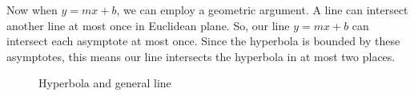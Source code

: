 \documentclass{homework}
\begin{document}
\begin{enumerate}[(a)]
        Now when $y = mx+b$, we can employ a geometric argument. A line can intersect another line at most once in Euclidean plane. So, our line $y = mx+b$ can intersect each asymptote at most once. Since the hyperbola is bounded by these asymptotes, this means our line intersects the hyperbola in at most two places.
        \begin{figure}[h!]
            \centering
            \caption{Hyperbola and general line}
        \end{figure}
        

\end{enumerate}
\end{document}
